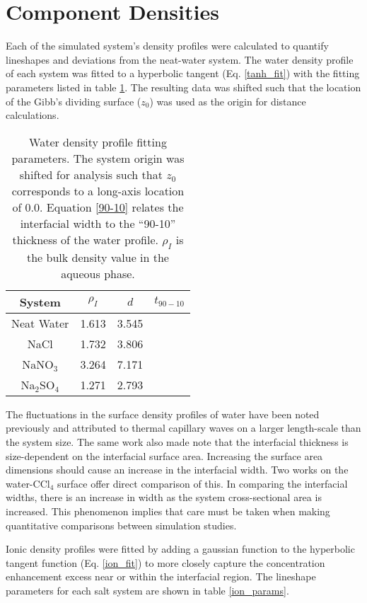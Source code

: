\section{Component Densities}

Each of the simulated system's density profiles were calculated to quantify lineshapes and deviations from the neat-water system. The water density profile of each system was fitted to a hyperbolic tangent (Eq. \ref{tanh_fit}) with the fitting parameters listed in table \ref{water_params}. The resulting data was shifted such that the location of the Gibb's dividing surface ($z_0$) was used as the origin for distance calculations.

\begin{table}[htdp]
	\begin{center}
	\begin{tabular}{|c||c|c|c|}
		\hline
		System & $\rho_I$ & $d$ & $t_{90-10}$ \\ \hline
		Neat Water & 1.613 & 3.545 \\ 
		NaCl & 1.732 & 3.806 \\
		NaNO$_3$ & 3.264 & 7.171 \\
		Na$_2$SO$_4$ & 1.271 & 2.793 \\
		\hline
	\end{tabular}
	\end{center}
	\caption{Water density profile fitting parameters. The system origin was shifted for analysis such that $z_0$ corresponds to a long-axis location of 0.0. Equation \ref{90-10} relates the interfacial width to the ``90-10'' thickness of the water profile. $\rho_I$ is the bulk density value in the aqueous phase.}
	\label{water_params}
\end{table}

The fluctuations in the surface density profiles of water have been noted previously and attributed to thermal capillary waves on a larger length-scale than the system size.\cite{Chang1996} The same work also made note that the interfacial thickness is size-dependent on the interfacial surface area. Increasing the surface area dimensions should cause an increase in the interfacial width. Two works on the water-CCl$_4$ surface offer direct comparison of this.\cite{Chang1996,Hore2008} In comparing the interfacial widths, there is an increase in width as the system cross-sectional area is increased. This phenomenon implies that care must be taken when making quantitative comparisons between simulation studies.

Ionic density profiles were fitted by adding a gaussian function to the hyperbolic tangent function (Eq. \ref{ion_fit}) to more closely capture the concentration enhancement excess near or within the interfacial region. The lineshape parameters for each salt system are shown in table \ref{ion_params}.

